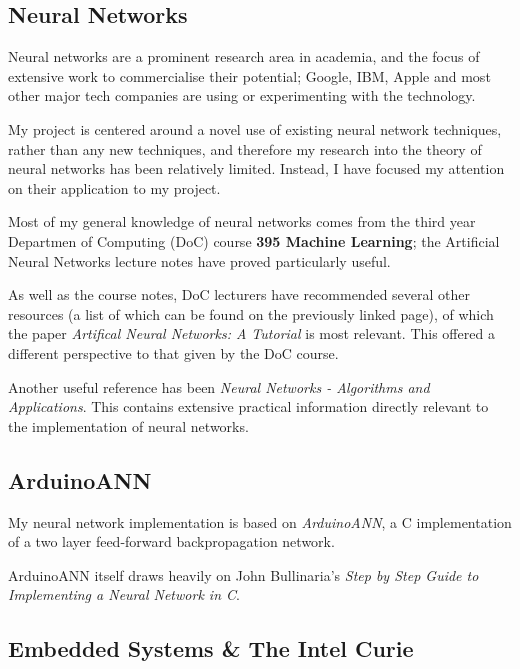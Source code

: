 \documentclass[a4paper]{article}
\begin{document}
\subsection{Neural Networks}%
\label{subsec:bg_neuralnetworks}

Neural networks are a prominent research area in academia, and the focus of extensive work to commercialise their potential; Google, IBM, Apple and most other major tech companies are using or experimenting with the technology.

My project is centered around a novel use of existing neural network techniques, rather than any new techniques, and therefore my research into the theory of neural networks has been relatively limited. Instead, I have focused my attention on their application to my project.

Most of my general knowledge of neural networks comes from the third year Departmen of Computing (DoC) course \textbf{395 Machine Learning}\cite{bgref0}; the Artificial Neural Networks lecture notes have proved particularly useful.

As well as the course notes, DoC lecturers have recommended several other resources (a list of which can be found on the previously linked page), of which the paper \textit{Artifical Neural Networks: A Tutorial}\cite{bgref1} is most relevant. This offered a different perspective to that given by the DoC course.

Another useful reference has been \textit{Neural Networks - Algorithms and Applications}\cite{bgref2}. This contains extensive practical information directly relevant to the implementation of neural networks.

\subsection{ArduinoANN}%
\label{subsec:bg_arduinoann}

My neural network implementation is based on \textit{ArduinoANN}\cite{bgref3}, a C implementation of a two layer feed-forward backpropagation network. 

ArduinoANN itself draws heavily on John Bullinaria's \textit{Step by Step Guide to Implementing a Neural Network in C}\cite{bgref4}.

\subsection{Embedded Systems \& The Intel Curie}%
\label{subsec:bg_embeddedsystems}
\end{document}
